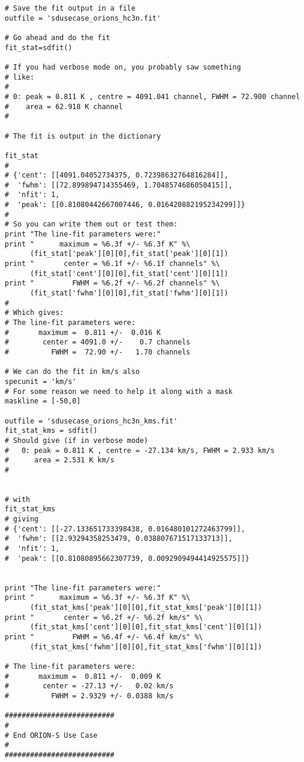 \begin{verbatim}
# Save the fit output in a file
outfile = 'sdusecase_orions_hc3n.fit'

# Go ahead and do the fit
fit_stat=sdfit()

# If you had verbose mode on, you probably saw something
# like:
#
# 0: peak = 0.811 K , centre = 4091.041 channel, FWHM = 72.900 channel
#    area = 62.918 K channel
#

# The fit is output in the dictionary

fit_stat
#
# {'cent': [[4091.04052734375, 0.72398632764816284]],
#  'fwhm': [[72.899894714355469, 1.7048574686050415]],
#  'nfit': 1,
#  'peak': [[0.81080442667007446, 0.016420882195234299]]}
#
# So you can write them out or test them:
print "The line-fit parameters were:"
print "      maximum = %6.3f +/- %6.3f K" %\
      (fit_stat['peak'][0][0],fit_stat['peak'][0][1])
print "       center = %6.1f +/- %6.1f channels" %\
      (fit_stat['cent'][0][0],fit_stat['cent'][0][1])
print "         FWHM = %6.2f +/- %6.2f channels" %\
      (fit_stat['fwhm'][0][0],fit_stat['fwhm'][0][1])
#
# Which gives:
# The line-fit parameters were:
#       maximum =  0.811 +/-  0.016 K
#        center = 4091.0 +/-    0.7 channels
#          FWHM =  72.90 +/-   1.70 channels

# We can do the fit in km/s also
specunit = 'km/s'
# For some reason we need to help it along with a mask
maskline = [-50,0]

outfile = 'sdusecase_orions_hc3n_kms.fit'
fit_stat_kms = sdfit()
# Should give (if in verbose mode)
#   0: peak = 0.811 K , centre = -27.134 km/s, FWHM = 2.933 km/s
#      area = 2.531 K km/s
#


# with
fit_stat_kms
# giving
# {'cent': [[-27.133651733398438, 0.016480101272463799]],
#  'fwhm': [[2.93294358253479, 0.038807671517133713]],
#  'nfit': 1,
#  'peak': [[0.81080895662307739, 0.0092909494414925575]]}


print "The line-fit parameters were:"
print "      maximum = %6.3f +/- %6.3f K" %\
      (fit_stat_kms['peak'][0][0],fit_stat_kms['peak'][0][1])
print "       center = %6.2f +/- %6.2f km/s" %\
      (fit_stat_kms['cent'][0][0],fit_stat_kms['cent'][0][1])
print "         FWHM = %6.4f +/- %6.4f km/s" %\
      (fit_stat_kms['fwhm'][0][0],fit_stat_kms['fwhm'][0][1])

# The line-fit parameters were:
#       maximum =  0.811 +/-  0.009 K
#        center = -27.13 +/-   0.02 km/s
#          FWHM = 2.9329 +/- 0.0388 km/s

##########################
#
# End ORION-S Use Case
#
##########################
\end{verbatim}

